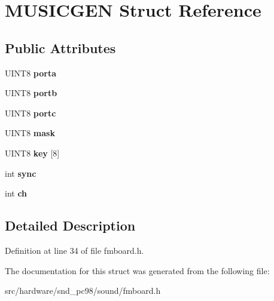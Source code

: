 \hypertarget{structMUSICGEN}{\section{M\-U\-S\-I\-C\-G\-E\-N Struct Reference}
\label{structMUSICGEN}
}
\subsection*{Public Attributes}
\begin{DoxyCompactItemize}
\item 
\hypertarget{structMUSICGEN_a45cbe06bbf8bee9accacd0d6353ddb75}{U\-I\-N\-T8 {\bfseries porta}}\label{structMUSICGEN_a45cbe06bbf8bee9accacd0d6353ddb75}

\item 
\hypertarget{structMUSICGEN_a0be44e727db0f7ef542a687f1da11723}{U\-I\-N\-T8 {\bfseries portb}}\label{structMUSICGEN_a0be44e727db0f7ef542a687f1da11723}

\item 
\hypertarget{structMUSICGEN_ab38422f8a3c45b5d46a76c8e037b9bc0}{U\-I\-N\-T8 {\bfseries portc}}\label{structMUSICGEN_ab38422f8a3c45b5d46a76c8e037b9bc0}

\item 
\hypertarget{structMUSICGEN_a4f02a14a7381ada1b95bd4b3244b3ad4}{U\-I\-N\-T8 {\bfseries mask}}\label{structMUSICGEN_a4f02a14a7381ada1b95bd4b3244b3ad4}

\item 
\hypertarget{structMUSICGEN_a3df727b0c0beef206260f4183b6db860}{U\-I\-N\-T8 {\bfseries key} \mbox{[}8\mbox{]}}\label{structMUSICGEN_a3df727b0c0beef206260f4183b6db860}

\item 
\hypertarget{structMUSICGEN_abb85b74785f78d37859623906462e149}{int {\bfseries sync}}\label{structMUSICGEN_abb85b74785f78d37859623906462e149}

\item 
\hypertarget{structMUSICGEN_a57ef6298d06733c64cdfc9bdf3f44d53}{int {\bfseries ch}}\label{structMUSICGEN_a57ef6298d06733c64cdfc9bdf3f44d53}

\end{DoxyCompactItemize}


\subsection{Detailed Description}


Definition at line 34 of file fmboard.\-h.



The documentation for this struct was generated from the following file\-:\begin{DoxyCompactItemize}
\item 
src/hardware/snd\-\_\-pc98/sound/fmboard.\-h\end{DoxyCompactItemize}
